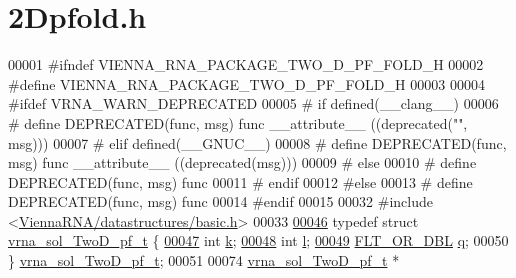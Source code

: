 \hypertarget{2Dpfold_8h_source}{}\section{2\+Dpfold.h}
\label{2Dpfold_8h_source}

\begin{DoxyCode}
00001 \textcolor{preprocessor}{#ifndef VIENNA\_RNA\_PACKAGE\_TWO\_D\_PF\_FOLD\_H}
00002 \textcolor{preprocessor}{#define VIENNA\_RNA\_PACKAGE\_TWO\_D\_PF\_FOLD\_H}
00003 
00004 \textcolor{preprocessor}{#ifdef VRNA\_WARN\_DEPRECATED}
00005 \textcolor{preprocessor}{# if defined(\_\_clang\_\_)}
00006 \textcolor{preprocessor}{#  define DEPRECATED(func, msg) func \_\_attribute\_\_ ((deprecated("", msg)))}
00007 \textcolor{preprocessor}{# elif defined(\_\_GNUC\_\_)}
00008 \textcolor{preprocessor}{#  define DEPRECATED(func, msg) func \_\_attribute\_\_ ((deprecated(msg)))}
00009 \textcolor{preprocessor}{# else}
00010 \textcolor{preprocessor}{#  define DEPRECATED(func, msg) func}
00011 \textcolor{preprocessor}{# endif}
00012 \textcolor{preprocessor}{#else}
00013 \textcolor{preprocessor}{# define DEPRECATED(func, msg) func}
00014 \textcolor{preprocessor}{#endif}
00015 
00032 \textcolor{preprocessor}{#include <\hyperlink{datastructures_2basic_8h}{ViennaRNA/datastructures/basic.h}>}
00033 
\hyperlink{group__kl__neighborhood__pf}{00046} \textcolor{keyword}{typedef} \textcolor{keyword}{struct }\hyperlink{group__kl__neighborhood__pf_structvrna__sol__TwoD__pf__t}{vrna\_sol\_TwoD\_pf\_t} \{
\hyperlink{group__kl__neighborhood__pf_ad1f23b46dc4ebd373abdeb0382d87b83}{00047}   \textcolor{keywordtype}{int}         \hyperlink{group__kl__neighborhood__pf_ad1f23b46dc4ebd373abdeb0382d87b83}{k};  
\hyperlink{group__kl__neighborhood__pf_a01133c264eff2c988d144e07803d1b8b}{00048}   \textcolor{keywordtype}{int}         \hyperlink{group__kl__neighborhood__pf_a01133c264eff2c988d144e07803d1b8b}{l};  
\hyperlink{group__kl__neighborhood__pf_a17ebbf425b8769ded74b5c7b85e58ee1}{00049}   \hyperlink{group__data__structures_ga31125aeace516926bf7f251f759b6126}{FLT\_OR\_DBL}  \hyperlink{group__kl__neighborhood__pf_a17ebbf425b8769ded74b5c7b85e58ee1}{q};  
00050 \} \hyperlink{group__kl__neighborhood__pf_ga5e449fbd695406aabd2bcabddc374621}{vrna\_sol\_TwoD\_pf\_t};
00051 
00074 \hyperlink{group__kl__neighborhood__pf_structvrna__sol__TwoD__pf__t}{vrna\_sol\_TwoD\_pf\_t} *

\end{DoxyCode}
